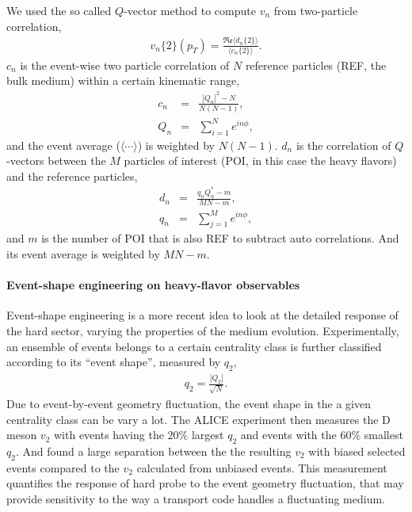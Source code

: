 We used the so called $Q$-vector method to compute $v_n$ from two-particle correlation,
\begin{eqnarray}
v_n\{2\}(p_T) = \frac{\mathfrak{Re}\langle d_n\{2\} \rangle}{\langle c_n\{2\}\rangle}.
\end{eqnarray}
$c_n$ is the event-wise two particle correlation of $N$ reference particles (REF, the bulk medium) within a certain kinematic range,
\begin{eqnarray}
c_n &=& \frac{|Q_n|^2 - N}{N(N-1)},  \\
Q_n &=& \sum_{i=1}^N e^{i n \phi},
\end{eqnarray}
and the event average ($\langle\cdots\rangle$) is weighted by $N(N-1)$.
$d_n$ is the correlation of $Q$-vectors between the $M$ particles of interest (POI, in this case the heavy flavors) and the reference particles,
\begin{eqnarray}
d_n &=& \frac{q_n Q_n^* - m}{MN-m},  \\
q_n &=& \sum_{j=1}^M e^{i n \phi},
\end{eqnarray}
and $m$ is the number of POI that is also REF to subtract auto correlations. 
And its event average is weighted by $MN-m$.

\paragraph{Event-shape engineering on heavy-flavor observables}
Event-shape engineering is a more recent idea to look at the detailed response of the hard sector, varying the properties of the medium evolution.
Experimentally, an ensemble of events belongs to a certain centrality class is further classified according to its ``event shape'', measured by $q_2$,
\begin{eqnarray}
q_2 = \frac{|Q_2|}{\sqrt{N}}.
\end{eqnarray}
Due to event-by-event geometry fluctuation, the event shape in the a given centrality class can be vary a lot.
The ALICE experiment then measures the D meson $v_2$ with events having the $20\%$ largest $q_2$ and events with the $60\%$ smallest $q_2$.
And found a large separation between the the resulting $v_2$ with biased selected events compared to the $v_2$ calculated from unbiased events.
This measurement quantifies the response of hard probe to the event geometry fluctuation, that may provide sensitivity to the way a transport code handles a fluctuating medium.


